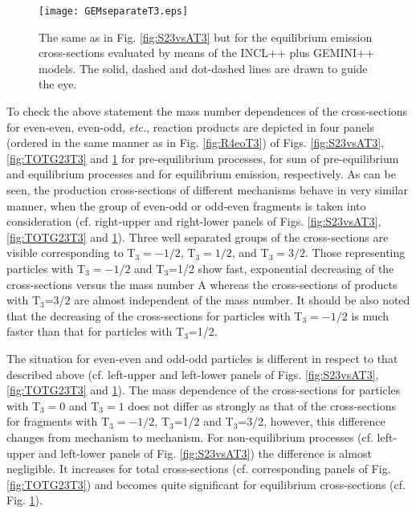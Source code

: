 %
\begin{figure}[!h]
	\centering
	\texttt{[image: GEMseparateT3.eps]}

	\caption{The same as in Fig. \ref{fig:S23vsAT3} but for the equilibrium
		emission cross-sections evaluated by means of the INCL++ plus GEMINI++
		models. The solid, dashed and dot-dashed lines are drawn to guide the eye.
	}
	\label{fig:GEMseparateT3}
\end{figure}
%
  To check the above statement the mass number dependences  of the cross-sections for even-even, even-odd,\emph{ etc.}, reaction products are depicted in four panels (ordered in the same manner as in Fig. \ref{fig:R4eoT3}) of Figs. \ref{fig:S23vsAT3}, \ref{fig:TOTG23T3} and \ref{fig:GEMseparateT3} for pre-equilibrium processes, for sum of pre-equilibrium and equilibrium processes and for equilibrium emission, respectively.
As can be seen,  the production cross-sections  of different mechanisms behave in very similar manner, when the group of even-odd or odd-even  fragments is taken into consideration (cf. right-upper and right-lower panels of Figs.  \ref{fig:S23vsAT3}, \ref{fig:TOTG23T3} and \ref{fig:GEMseparateT3}). Three well separated groups of the cross-sections are visible
corresponding to T$_3=-1/2$, T$_3=1/2$, and T$_3=3/2$. Those representing particles with T$_3=-1/2$ and T$_3$=1/2 show fast, exponential decreasing of the cross-sections versus the mass number A whereas the cross-sections of products with T$_3$=3/2 are almost independent of the mass number.  It should be also noted that the decreasing of the cross-sections for particles with T$_3=-1/2$ is much faster than that for particles with T$_3$=1/2.
  
  
  The situation for even-even and odd-odd particles is different  in respect to
  that described above
(cf. left-upper and left-lower panels of
  Figs. \ref{fig:S23vsAT3}, \ref{fig:TOTG23T3} and \ref{fig:GEMseparateT3}).
  The mass dependence of the cross-sections for particles with
  T$_3=0$  and T$_3=1$ does not differ as strongly as that of the cross-sections
  for fragments
  with T$_3=-1/2$, T$_3$=1/2 and T$_3$=3/2, however, this difference changes from mechanism
  to mechanism.  For non-equilibrium processes (cf. left-upper and left-lower panels of Fig.
  \ref{fig:S23vsAT3}) the difference is almost negligible.  It
  increases for total cross-sections (cf. corresponding panels of
  Fig. \ref{fig:TOTG23T3}) and becomes quite significant for equilibrium
  cross-sections (cf. Fig. \ref{fig:GEMseparateT3}).
%

